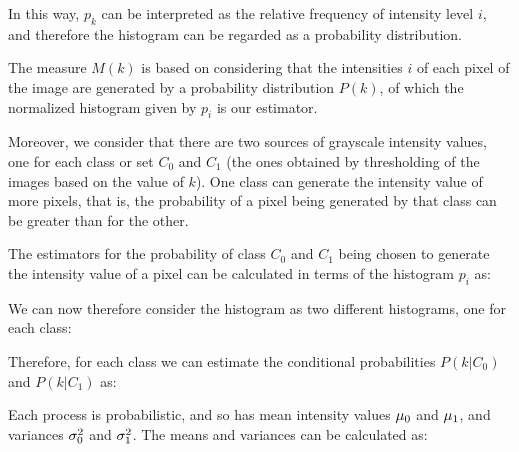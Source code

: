 
In this way, $p_k$ can be interpreted as the relative frequency of intensity level $i$, and therefore the histogram can be regarded as a probability distribution.



The measure $M(k)$ is based on considering that the intensities $i$ of each pixel of the image are generated by a probability distribution $P(k)$, of which the normalized histogram given by $p_i$ is our estimator.

Moreover, we consider that there are two sources of grayscale intensity values, one for each class or set $C_0$ and $C_1$ (the ones obtained by thresholding of the images based on the value of $k$). One class can generate the intensity value of more pixels, that is, the probability of a pixel being generated by that class can be greater than for the other.


The estimators for the probability of class $C_0$ and $C_1$ being chosen to generate the intensity value of a pixel can be calculated in terms of the histogram $p_i$ as:


We can now therefore consider the histogram as two different histograms, one for each class:


Therefore, for each class we can estimate the conditional probabilities $P(k|C_0)$  and $P(k|C_1)$ as:



Each process is probabilistic, and so has mean intensity values  $\mu_0$ and $\mu_1$, and variances $\sigma_0^2$ and $\sigma_1^2$. The means and variances can be calculated as:

